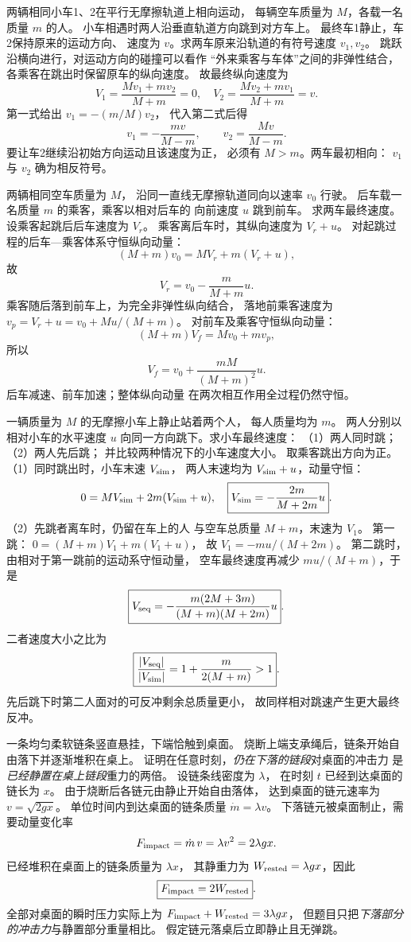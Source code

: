 两辆相同小车1、2在平行无摩擦轨道上相向运动，
每辆空车质量为 $M$，各载一名质量 $m$ 的人。
小车相遇时两人沿垂直轨道方向跳到对方车上。
最终车1静止，车2保持原来的运动方向、
速度为 $v$。求两车原来沿轨道的有符号速度 $v_1,v_2$。
\exsolution
跳跃沿横向进行，对运动方向的碰撞可以看作
“外来乘客与车体”之间的非弹性结合，
各乘客在跳出时保留原车的纵向速度。
故最终纵向速度为
\[
V_1=\frac{Mv_1+mv_2}{M+m}=0,\quad
V_2=\frac{Mv_2+mv_1}{M+m}=v.
\]
第一式给出 $v_1=-(m/M)v_2$，
代入第二式后得
\[
\boxed{v_1=-\frac{mv}{M-m},\qquad
v_2=\frac{Mv}{M-m}}.
\]
\excheck 要让车2继续沿初始方向运动且该速度为正，
必须有 $M>m$。两车最初相向：
$v_1$ 与 $v_2$ 确为相反符号。

两辆相同空车质量为 $M$，
沿同一直线无摩擦轨道同向以速率 $v_0$ 行驶。
后车载一名质量 $m$ 的乘客，乘客以相对后车的
向前速度 $u$ 跳到前车。
求两车最终速度。
\exsolution
设乘客起跳后后车速度为 $V_r$。
乘客离后车时，其纵向速度为 $V_r+u$。
对起跳过程的后车—乘客体系守恒纵向动量：
\[
(M+m)v_0=MV_r+m(V_r+u),
\]
故
\[
\boxed{V_r=v_0-\frac{m}{M+m}u}.
\]
乘客随后落到前车上，为完全非弹性纵向结合，
落地前乘客速度为
$v_p=V_r+u=v_0+Mu/(M+m)$。
对前车及乘客守恒纵向动量：
\[
(M+m)V_f=Mv_0+mv_p,
\]
所以
\[
\boxed{V_f=v_0+\frac{mM}{(M+m)^2}u}.
\]
\excheck 后车减速、前车加速；整体纵向动量
在两次相互作用全过程仍然守恒。

一辆质量为 $M$ 的无摩擦小车上静止站着两个人，
每人质量均为 $m$。
两人分别以相对小车的水平速度 $u$
向同一方向跳下。求小车最终速度：
（1）两人同时跳；
（2）两人先后跳；
并比较两种情况下的小车速度大小。
\exsolution
取乘客跳出方向为正。
（1）同时跳出时，小车末速 $V_{\rm sim}$，
两人末速均为 $V_{\rm sim}+u$，动量守恒：
\[
0=MV_{\rm sim}+2m(V_{\rm sim}+u),
\quad
\boxed{V_{\rm sim}=-\frac{2m}{M+2m}u}.
\]
（2）先跳者离车时，仍留在车上的人
与空车总质量 $M+m$，末速为 $V_1$。
第一跳：
$0=(M+m)V_1+m(V_1+u)$，
故 $V_1=-mu/(M+2m)$。
第二跳时，由相对于第一跳前的运动系守恒动量，
空车最终速度再减少 $mu/(M+m)$，于是
\[
\boxed{V_{\rm seq}=
-\frac{m(2M+3m)}{(M+m)(M+2m)}u}.
\]
二者速度大小之比为
\[
\boxed{\frac{|V_{\rm seq}|}{|V_{\rm sim}|}
=1+\frac{m}{2(M+m)}>1}.
\]
\excheck 先后跳下时第二人面对的可反冲剩余总质量更小，
故同样相对跳速产生更大最终反冲。

一条均匀柔软链条竖直悬挂，下端恰触到桌面。
烧断上端支承绳后，链条开始自由落下并逐渐堆积在桌上。
证明在任意时刻，\emph{仍在下落的链段}对桌面的冲击力
是\emph{已经静置在桌上链段}重力的两倍。
\exsolution
设链条线密度为 $\lambda$，
在时刻 $t$ 已经到达桌面的链长为 $x$。
由于烧断后各链元由静止开始自由落体，
达到桌面的链元速率为 $v=\sqrt{2gx}$。
单位时间内到达桌面的链条质量
$\dot m=\lambda v$。
下落链元被桌面制止，需要动量变化率
\[
F_{\rm impact}=\dot m\,v=\lambda v^2=2\lambda gx.
\]
已经堆积在桌面上的链条质量为 $\lambda x$，
其静重力为
$W_{\rm rested}=\lambda gx$，因此
\[
\boxed{F_{\rm impact}=2W_{\rm rested}}.
\]
\excheck 全部对桌面的瞬时压力实际上为
$F_{\rm impact}+W_{\rm rested}=3\lambda gx$，
但题目只把\emph{下落部分的冲击力}与静置部分重量相比。
假定链元落桌后立即静止且无弹跳。

